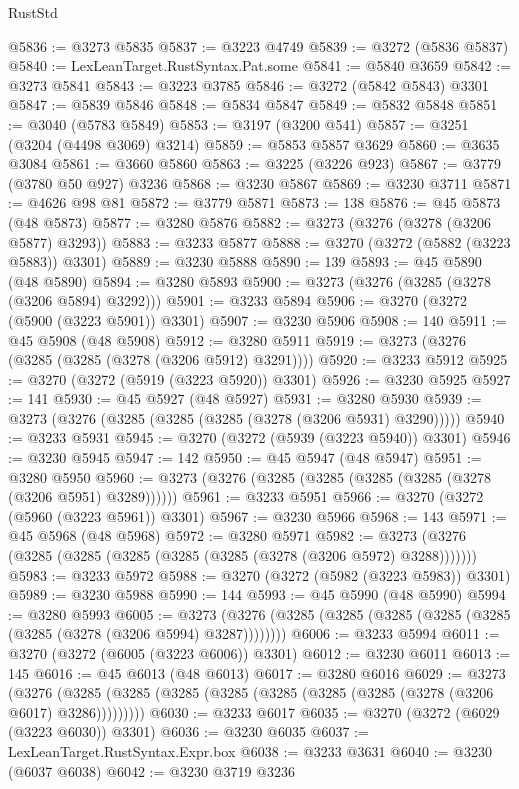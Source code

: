 \begin{lexlean}{RustStd}
\begin{coremodule}
@5836 := @3273 @5835
@5837 := @3223 @4749
@5839 := @3272 (@5836 @5837)
@5840 := LexLeanTarget.RustSyntax.Pat.some
@5841 := @5840 @3659
@5842 := @3273 @5841
@5843 := @3223 @3785
@5846 := @3272 (@5842 @5843) @3301
@5847 := @5839 @5846
@5848 := @5834 @5847
@5849 := @5832 @5848
@5851 := @3040 (@5783 @5849)
@5853 := @3197 (@3200 @541)
@5857 := @3251 (@3204 (@4498 @3069) @3214)
@5859 := @5853 @5857 @3629
@5860 := @3635 @3084
@5861 := @3660 @5860
@5863 := @3225 (@3226 @923)
@5867 := @3779 (@3780 @50 @927) @3236
@5868 := @3230 @5867
@5869 := @3230 @3711
@5871 := @4626 @98 @81
@5872 := @3779 @5871
@5873 := 138
@5876 := @45 @5873 (@48 @5873)
@5877 := @3280 @5876
@5882 := @3273 (@3276 (@3278 (@3206 @5877) @3293))
@5883 := @3233 @5877
@5888 := @3270 (@3272 (@5882 (@3223 @5883)) @3301)
@5889 := @3230 @5888
@5890 := 139
@5893 := @45 @5890 (@48 @5890)
@5894 := @3280 @5893
@5900 := @3273 (@3276 (@3285 (@3278 (@3206 @5894) @3292)))
@5901 := @3233 @5894
@5906 := @3270 (@3272 (@5900 (@3223 @5901)) @3301)
@5907 := @3230 @5906
@5908 := 140
@5911 := @45 @5908 (@48 @5908)
@5912 := @3280 @5911
@5919 := @3273 (@3276 (@3285 (@3285 (@3278 (@3206 @5912) @3291))))
@5920 := @3233 @5912
@5925 := @3270 (@3272 (@5919 (@3223 @5920)) @3301)
@5926 := @3230 @5925
@5927 := 141
@5930 := @45 @5927 (@48 @5927)
@5931 := @3280 @5930
@5939 := @3273 (@3276 (@3285 (@3285 (@3285 (@3278 (@3206 @5931) @3290)))))
@5940 := @3233 @5931
@5945 := @3270 (@3272 (@5939 (@3223 @5940)) @3301)
@5946 := @3230 @5945
@5947 := 142
@5950 := @45 @5947 (@48 @5947)
@5951 := @3280 @5950
@5960 := @3273 (@3276 (@3285 (@3285 (@3285 (@3285 (@3278 (@3206 @5951) @3289))))))
@5961 := @3233 @5951
@5966 := @3270 (@3272 (@5960 (@3223 @5961)) @3301)
@5967 := @3230 @5966
@5968 := 143
@5971 := @45 @5968 (@48 @5968)
@5972 := @3280 @5971
@5982 := @3273 (@3276 (@3285 (@3285 (@3285 (@3285 (@3285 (@3278 (@3206 @5972) @3288)))))))
@5983 := @3233 @5972
@5988 := @3270 (@3272 (@5982 (@3223 @5983)) @3301)
@5989 := @3230 @5988
@5990 := 144
@5993 := @45 @5990 (@48 @5990)
@5994 := @3280 @5993
@6005 := @3273 (@3276 (@3285 (@3285 (@3285 (@3285 (@3285 (@3285 (@3278 (@3206 @5994) @3287))))))))
@6006 := @3233 @5994
@6011 := @3270 (@3272 (@6005 (@3223 @6006)) @3301)
@6012 := @3230 @6011
@6013 := 145
@6016 := @45 @6013 (@48 @6013)
@6017 := @3280 @6016
@6029 := @3273
    (@3276 (@3285 (@3285 (@3285 (@3285 (@3285 (@3285 (@3285 (@3278 (@3206 @6017) @3286)))))))))
@6030 := @3233 @6017
@6035 := @3270 (@3272 (@6029 (@3223 @6030)) @3301)
@6036 := @3230 @6035
@6037 := LexLeanTarget.RustSyntax.Expr.box
@6038 := @3233 @3631
@6040 := @3230 (@6037 @6038)
@6042 := @3230 @3719 @3236

\end{coremodule}
\end{lexlean}
